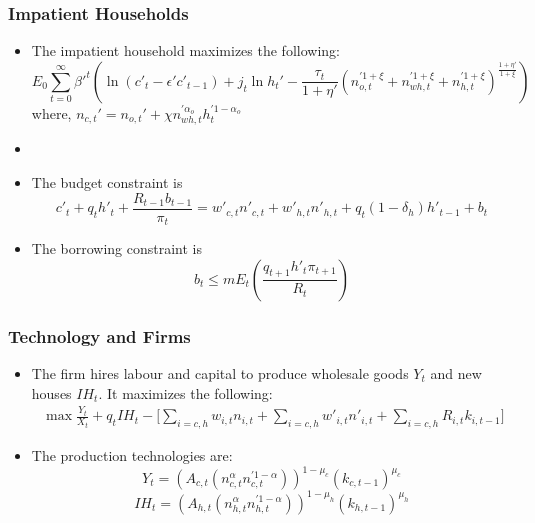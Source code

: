 \documentclass[blue]{beamer}
\begin{document}
\begin{frame} \frametitle{Impatient Households}
\small
\begin{itemize}
\item The impatient household maximizes the following:
\[
E_0 \sum_{t=0}^{\infty} \beta'^t  \left(\ln(c'_t - \epsilon' c'_{t-1}) + j_t \ln h_t' - \frac{\tau_t}{1+\eta'}  (n_{o,t}^{'1+\xi}+ n_{wh,t}^{'1+\xi}  + n_{h,t}^{'1+\xi} ) ^{\frac{1+\eta'}{1+\xi}}  \right)
\]
where, 
${n_{c,t}' = n_{o,t}' + \chi n_{wh,t}^{'\alpha_o} h_t^{'1-\alpha_o} }$
\item []
\item The budget constraint is 
	\begin{equation}\label{eq:impatient_hh_BC}
		c'_t + q_t h'_t + \frac{R_{t-1}b_{t-1}}{\pi_t}  = w'_{c,t}n'_{c,t} + w'_{h,t}n'_{h,t}  + q_t (1-\delta_h) h'_{t-1} + b_t   
	\end{equation} 
	\item The borrowing constraint is 
	\begin{equation}\label{eq:BC}
		b_t \leq m E_t\left(\frac{q_{t+1}h'_t \pi_{t+1}}{R_t}\right)
	\end{equation}
	\end{itemize}
	\end{frame}
	
	\begin{frame}\frametitle{Technology and Firms}
	\small
	\begin{itemize}
\item The  firm hires labour and capital  to produce wholesale goods $Y_t$ and new houses $IH_t$. It maximizes the following:
\begin{multline} 
	\	\max \frac{Y_t}{X_t} + q_t IH_t - \big[\sum_{i=c,h} w_{i,t} n_{i,t} + \sum_{i=c,h} w'_{i,t}n'_{i,t} + \sum_{i=c,h} R_{i,t}  k_{i,t-1} 
	 \big]
\end{multline} 
	\item The production technologies are:
	\begin{equation}
		Y_t = \left(A_{c,t}(n_{c,t}^\alpha n_{c,t}^{'1-\alpha})\right)^{1-\mu_c} (k_{c,t-1})^{\mu_c}
	\end{equation}
	\begin{equation}
		IH_t = \left(A_{h,t} (n_{h,t}^\alpha n_{h,t}^{'1-\alpha})\right)^{1-\mu_h} (k_{h,t-1})^{\mu_h} 
	\end{equation}
\end{itemize}
	\end{frame}
	
\end{document}
